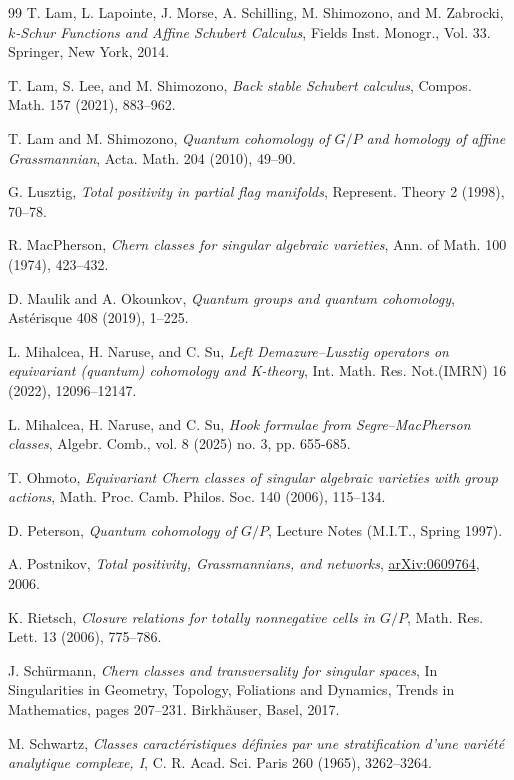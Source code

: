 \documentclass[12pt]{amsart}
\begin{document}
\begin{thebibliography}{99}
T. Lam, L. Lapointe, J. Morse, A. Schilling, M. Shimozono, and M. Zabrocki, {\em $k$-Schur Functions and Affine Schubert Calculus}, Fields Inst. Monogr., Vol. 33. Springer, New York, 2014.

T. Lam, S. Lee, and M. Shimozono, \emph{Back stable Schubert calculus}, Compos. Math. 157 (2021), 883--962.

T. Lam and M. Shimozono, {\em Quantum cohomology of $G/P$ and homology of affine Grassmannian}, Acta. Math. 
204 (2010),  49--90.


G. Lusztig, {\em Total positivity in partial flag manifolds}, Represent. Theory 2 (1998),
70--78.


R. MacPherson,  {\em Chern classes for singular algebraic varieties}, Ann. of Math.  100 (1974), 423--432.

D. Maulik and A. Okounkov, {\em Quantum groups and quantum cohomology},
Ast\'erisque  408 (2019), 1--225.



L. Mihalcea, H. Naruse, and C. Su, 
{\em Left Demazure--Lusztig operators on equivariant (quantum) cohomology and K-theory}, Int. Math. Res. Not.(IMRN)  16 (2022), 12096--12147.

L. Mihalcea, H. Naruse, and C. Su, {\em
Hook formulae from Segre--MacPherson classes},
Algebr. Comb., vol. 8 (2025) no. 3, pp. 655-685.


T. Ohmoto, {\em Equivariant Chern classes of singular algebraic varieties with group actions}, Math. Proc. Camb. Philos. Soc. 140 (2006), 115--134.

D. Peterson, {\em Quantum cohomology of $G/P$}, Lecture Notes (M.I.T., Spring 1997).

A. Postnikov, {\em Total positivity, Grassmannians, and networks}, 
\href{https://arxiv.org/abs/math/0609764}{arXiv:0609764}, 2006.


K. Rietsch, {\em Closure relations for totally nonnegative cells in $G/P$}, Math. Res. Lett. 13 (2006),  775--786.

J. Sch\"urmann, {\em Chern classes and transversality for singular spaces}, In Singularities in Geometry, Topology, Foliations and Dynamics, Trends in Mathematics, pages 207–231. Birkh\"auser, Basel, 2017.

M. Schwartz, {\em Classes caract\'eristiques d\'efinies par une stratification
d'une vari\'et\'e analytique complexe, I}, C. R. Acad. Sci. Paris 260 (1965), 3262--3264.


\end{thebibliography}
\end{document}
